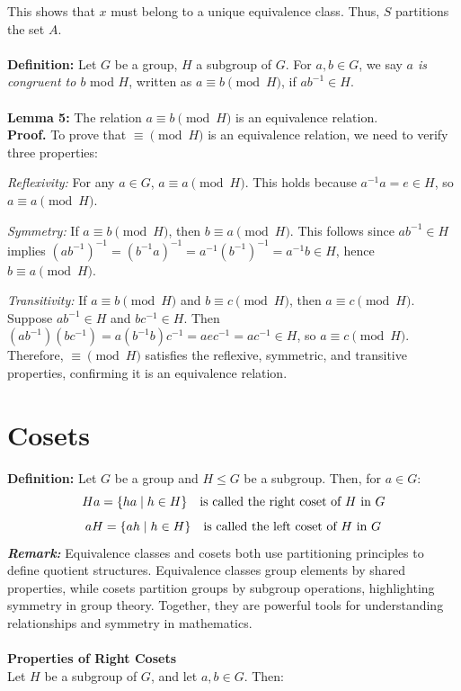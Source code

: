 This shows that \( x \) must belong to a unique equivalence class. Thus, \( S \) partitions the set \( A \).
\\\\
\textbf{Definition:} Let \( G \) be a group, \( H \) a subgroup of \( G \). For \( a, b \in G \), we say \textit{\( a \) is congruent to \( b \)} mod \( H \), written as \( a \equiv b \pmod{H} \), if \( ab^{-1} \in H \).
\\\\
\textbf{Lemma 5:} The relation \( a \equiv b \pmod{H} \) is an equivalence relation.\\
\textbf{Proof.}
To prove that \( \equiv \pmod{H} \) is an equivalence relation, we need to verify three properties:

    \textit{Reflexivity:} For any \( a \in G \), \( a \equiv a \pmod{H} \). This holds because \( a^{-1} a = e \in H \), so \( a \equiv a \pmod{H} \).
    
    \textit{Symmetry:} If \( a \equiv b \pmod{H} \), then \( b \equiv a \pmod{H} \). This follows since \( ab^{-1} \in H \) implies \( (ab^{-1})^{-1} = (b^{-1}a)^{-1} = a^{-1}(b^{-1})^{-1} = a^{-1}b \in H \), hence \( b \equiv a \pmod{H} \).
    
    \textit{Transitivity:} If \( a \equiv b \pmod{H} \) and \( b \equiv c \pmod{H} \), then \( a \equiv c \pmod{H} \). Suppose \( ab^{-1} \in H \) and \( bc^{-1} \in H \). Then \( (ab^{-1})(bc^{-1}) = a(b^{-1}b)c^{-1} = aec^{-1} = ac^{-1} \in H \), so \( a \equiv c \pmod{H} \).
\\
Therefore, \( \equiv \pmod{H} \) satisfies the reflexive, symmetric, and transitive properties, confirming it is an equivalence relation.


\section{Cosets}
\textbf{Definition:} Let \( G \) be a group and \( H \leq G \) be a subgroup. Then, for \( a \in G \):
\[Ha = \{ ha \mid h \in H \} \quad \text{is called the right coset of \( H \) in \( G \)}\]
\[aH = \{ ah \mid h \in H \}\quad \text{is called the left coset of \( H \) in \( G \)}\]
\textit{\textbf{Remark:}} Equivalence classes and cosets both use partitioning principles to define quotient structures. Equivalence classes group elements by shared properties, while cosets partition groups by subgroup operations, highlighting symmetry in group theory. Together, they are powerful tools for understanding relationships and symmetry in mathematics.
\\\\
\textbf{Properties of Right Cosets}\\
Let \( H \) be a subgroup of \( G \), and let \( a, b \in G \). Then:

